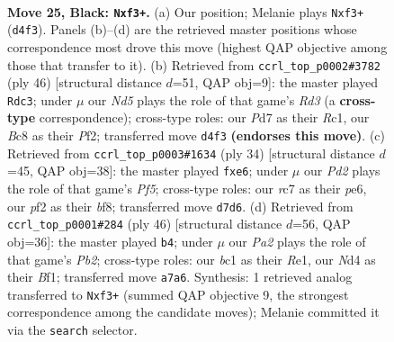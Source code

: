 \documentclass[11pt]{article}
\begin{document}
\clearpage

\begin{figure}[p]\centering
\begin{subfigure}{0.46\textwidth}\centering
\resizebox{\linewidth}{!}{%
\newchessgame
\chessboard[
  setfen={1rb2r2/p1Rp1pk1/8/4p2p/3n4/5PP1/PP3P1P/2B1KB1R b - - 0 25},
  showmover=false,
  pgfstyle=straightmove, color=movearrow, markmove={d4-f3}
]}
\caption{}
\end{subfigure}\hfill
\begin{subfigure}{0.46\textwidth}\centering
\resizebox{\linewidth}{!}{%
\newchessgame
\chessboard[
  setfen={4kb1r/5ppp/p3p3/3bP3/3N4/3RB3/1r3PPP/2R3K1 w - - 1 24},
  showmover=false,
  pgfstyle=straightmove, color=movearrow, markmove={d3-c3}
]}
\caption{}
\end{subfigure}
\\[4pt]
\begin{subfigure}{0.46\textwidth}\centering
\resizebox{\linewidth}{!}{%
\newchessgame
\chessboard[
  setfen={2b1kb1r/5p1p/p2pp3/5P2/5r2/2NR1B2/1PP3PP/2K4R w k - 0 18},
  showmover=false,
  pgfstyle=straightmove, color=movearrow, markmove={f5-e6}
]}
\caption{}
\end{subfigure}\hfill
\begin{subfigure}{0.46\textwidth}\centering
\resizebox{\linewidth}{!}{%
\newchessgame
\chessboard[
  setfen={3r2k1/3bRp1p/pr3pp1/3p4/3P1P2/2P5/1P3P1P/4RBK1 w - - 0 24},
  showmover=false,
  pgfstyle=straightmove, color=movearrow, markmove={b2-b4}
]}
\caption{}
\end{subfigure}
\caption{\textbf{Move 25, Black: \texttt{Nxf3+}.} (a) Our position; Melanie plays \texttt{Nxf3+} (\texttt{d4f3}). Panels (b)--(d) are the retrieved master positions whose correspondence most drove this move (highest QAP objective among those that transfer to it). (b) Retrieved from \texttt{ccrl\_top\_p0002\#3782} (ply 46) [structural distance $d$=51, QAP obj=9]: the master played \texttt{Rdc3}; under $\mu$ our \emph{Nd5} plays the role of that game's \emph{Rd3} (a \textbf{cross-type} correspondence); cross-type roles: our \emph{P}d7 as their \emph{R}c1, our \emph{B}c8 as their \emph{P}f2; transferred move \texttt{d4f3} \textbf{(endorses this move)}. (c) Retrieved from \texttt{ccrl\_top\_p0003\#1634} (ply 34) [structural distance $d$=45, QAP obj=38]: the master played \texttt{fxe6}; under $\mu$ our \emph{Pd2} plays the role of that game's \emph{Pf5}; cross-type roles: our \emph{r}c7 as their \emph{p}e6, our \emph{p}f2 as their \emph{b}f8; transferred move \texttt{d7d6}. (d) Retrieved from \texttt{ccrl\_top\_p0001\#284} (ply 46) [structural distance $d$=56, QAP obj=36]: the master played \texttt{b4}; under $\mu$ our \emph{Pa2} plays the role of that game's \emph{Pb2}; cross-type roles: our \emph{b}c1 as their \emph{R}e1, our \emph{N}d4 as their \emph{B}f1; transferred move \texttt{a7a6}. Synthesis: 1 retrieved analog transferred to \texttt{Nxf3+} (summed QAP objective 9, the strongest correspondence among the candidate moves); Melanie committed it via the \texttt{search} selector.}
\label{fig:thought-m49}
\end{figure}
\end{document}
